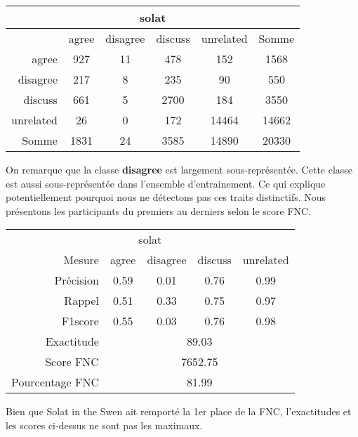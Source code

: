 \begin{center}
 \begin{tabular}{ r | c c c c | c }
  \multicolumn{6}{c}{solat}\\
  \hline
            & agree & disagree & discuss & unrelated & Somme \\
  \hline
  agree     & 927   & 11       & 478     & 152       & 1568  \\
  disagree  & 217   & 8        & 235     & 90        & 550   \\
  discuss   & 661   & 5        & 2700    & 184       & 3550  \\
  unrelated & 26    & 0        & 172     & 14464     & 14662 \\
  \hline
  Somme     & 1831  & 24       & 3585    & 14890     & 20330 \\
 \end{tabular}
\end{center}

On remarque que la classe \textbf{disagree} est largement sous-représentée. Cette classe est aussi sous-représentée dans l'ensemble d'entrainement. Ce qui explique potentiellement pourquoi nous ne détectons pas ces traits distinctifs. Nous présentons les participants du premiers au derniers selon le score FNC.
\begin{center}
 \begin{tabular}{ r | c c c c }
  \multicolumn{5}{c}{solat}\\
  Mesure     & agree & disagree & discuss & unrelated \\
  \hline
  Précision & 0.59  & 0.01     & 0.76    & 0.99      \\
  Rappel     & 0.51  & 0.33     & 0.75    & 0.97      \\
  F1score    & 0.55  & 0.03     & 0.76    & 0.98      \\
  \hline
  \hline
  Exactitude & \multicolumn{4}{c}{89.03}\\
  Score FNC & \multicolumn{4}{c}{7652.75}\\
  Pourcentage FNC & \multicolumn{4}{c}{81.99}\\
 \end{tabular}
\end{center}

Bien que Solat in the Swen ait remporté la 1er place de la FNC, l'exactitudes et les scores ci-dessus ne sont pas les maximaux.



